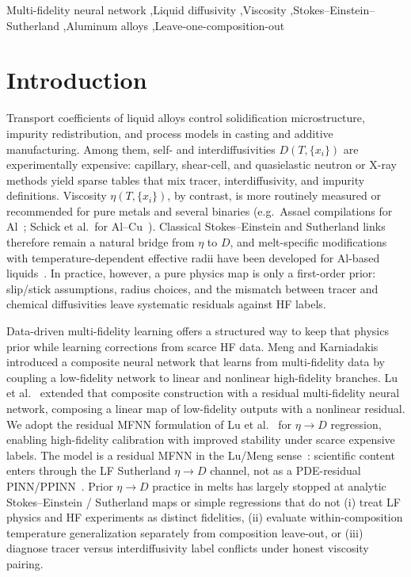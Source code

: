 \documentclass[review,12pt]{elsarticle}
\begin{document}
\begin{frontmatter}
\begin{keyword}
Multi-fidelity neural network \sep Liquid diffusivity \sep Viscosity \sep Stokes--Einstein--Sutherland \sep Aluminum alloys \sep Leave-one-composition-out
\end{keyword}

\end{frontmatter}

\section{Introduction}
\label{sec:intro}

Transport coefficients of liquid alloys control solidification microstructure, impurity redistribution, and process models in casting and additive manufacturing. Among them, self- and interdiffusivities $D(T,\{x_i\})$ are experimentally expensive: capillary, shear-cell, and quasielastic neutron or X-ray methods yield sparse tables that mix tracer, interdiffusivity, and impurity definitions. Viscosity $\eta(T,\{x_i\})$, by contrast, is more routinely measured or recommended for pure metals and several binaries (e.g.\ Assael compilations for Al~\cite{assael2006}; Schick et al.\ for Al--Cu~\cite{schick2012}). Classical Stokes--Einstein and Sutherland links therefore remain a natural bridge from $\eta$ to $D$, and melt-specific modifications with temperature-dependent effective radii have been developed for Al-based liquids~\cite{tang2015,chen2014}. In practice, however, a pure physics map is only a first-order prior: slip/stick assumptions, radius choices, and the mismatch between tracer and chemical diffusivities leave systematic residuals against HF labels.

Data-driven multi-fidelity learning offers a structured way to keep that physics prior while learning corrections from scarce HF data. Meng and Karniadakis~\cite{meng2020jcp} introduced a composite neural network that learns from multi-fidelity data by coupling a low-fidelity network to linear and nonlinear high-fidelity branches. Lu et al.~\cite{lu2020pnas} extended that composite construction with a residual multi-fidelity neural network, composing a linear map of low-fidelity outputs with a nonlinear residual. We adopt the residual MFNN formulation of Lu et al.~\cite{lu2020pnas} for $\eta\to D$ regression, enabling high-fidelity calibration with improved stability under scarce expensive labels. The model is a residual MFNN in the Lu/Meng sense~\cite{lu2020pnas,meng2020jcp}: scientific content enters through the LF Sutherland $\eta\to D$ channel, not as a PDE-residual PINN/PPINN~\cite{karniadakis2021}. Prior $\eta\to D$ practice in melts has largely stopped at analytic Stokes--Einstein / Sutherland maps or simple regressions that do not (i) treat LF physics and HF experiments as distinct fidelities, (ii) evaluate within-composition temperature generalization separately from composition leave-out, or (iii) diagnose tracer versus interdiffusivity label conflicts under honest viscosity pairing.
\end{document}
